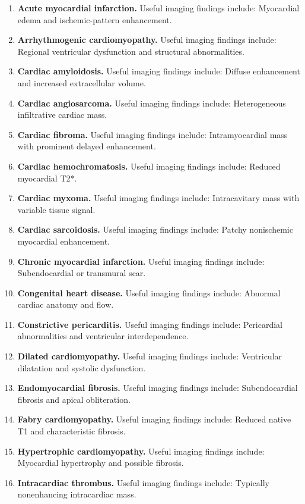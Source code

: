 \begin{enumerate}[leftmargin=*,itemsep=0.45em,topsep=0.4em]
\item \textbf{Acute myocardial infarction.} Useful imaging findings include: Myocardial edema and ischemic-pattern enhancement.
\item \textbf{Arrhythmogenic cardiomyopathy.} Useful imaging findings include: Regional ventricular dysfunction and structural abnormalities.
\item \textbf{Cardiac amyloidosis.} Useful imaging findings include: Diffuse enhancement and increased extracellular volume.
\item \textbf{Cardiac angiosarcoma.} Useful imaging findings include: Heterogeneous infiltrative cardiac mass.
\item \textbf{Cardiac fibroma.} Useful imaging findings include: Intramyocardial mass with prominent delayed enhancement.
\item \textbf{Cardiac hemochromatosis.} Useful imaging findings include: Reduced myocardial T2*.
\item \textbf{Cardiac myxoma.} Useful imaging findings include: Intracavitary mass with variable tissue signal.
\item \textbf{Cardiac sarcoidosis.} Useful imaging findings include: Patchy nonischemic myocardial enhancement.
\item \textbf{Chronic myocardial infarction.} Useful imaging findings include: Subendocardial or transmural scar.
\item \textbf{Congenital heart disease.} Useful imaging findings include: Abnormal cardiac anatomy and flow.
\item \textbf{Constrictive pericarditis.} Useful imaging findings include: Pericardial abnormalities and ventricular interdependence.
\item \textbf{Dilated cardiomyopathy.} Useful imaging findings include: Ventricular dilatation and systolic dysfunction.
\item \textbf{Endomyocardial fibrosis.} Useful imaging findings include: Subendocardial fibrosis and apical obliteration.
\item \textbf{Fabry cardiomyopathy.} Useful imaging findings include: Reduced native T1 and characteristic fibrosis.
\item \textbf{Hypertrophic cardiomyopathy.} Useful imaging findings include: Myocardial hypertrophy and possible fibrosis.
\item \textbf{Intracardiac thrombus.} Useful imaging findings include: Typically nonenhancing intracardiac mass.

\end{enumerate}
